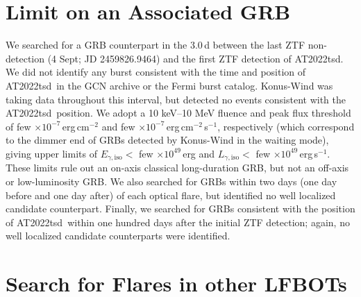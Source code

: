 \documentclass{nature_plusfigure}
\newcommand{\at}{AT2022tsd}
\begin{document}
\begin{methods}
\section{Limit on an Associated GRB}
\label{sec:grbsearch}

We searched for a GRB counterpart in the 3.0\,d between the last ZTF non-detection (4 Sept; JD 2459826.9464) and the first ZTF detection of \at. We did not identify any burst consistent with the time and position of \at\ in the GCN archive or the Fermi burst catalog. Konus-Wind was taking data throughout this interval, but detected no events consistent with the \at\ position. 
We adopt a 10 keV--10 MeV fluence and peak flux threshold of few $\times10^{-7}$\,erg\,cm$^{-2}$ and few $\times10^{-7}$\,erg\,cm$^{-2}$\,s$^{-1}$,
respectively (which correspond to the dimmer end of GRBs detected by Konus-Wind in the waiting mode\cite{Tsvetkova2021}),
giving upper limits of $E_{\gamma,\mathrm{iso}} <$ few $\times 10^{49}$\,erg and $L_{\gamma,\mathrm{iso}} <$ few $\times10^{49}$\,erg\,s$^{-1}$. 
These limits rule out an on-axis classical long-duration GRB, but not an off-axis or low-luminosity GRB\cite{Cano2017}.
We also searched for GRBs within two days (one day before and one day after) of each optical flare, but identified no well localized candidate counterpart.
Finally, we searched for GRBs consistent with the position of \at\ within one hundred days after the initial ZTF detection; again, no well localized candidate counterparts were identified.

\section{Search for Flares in other LFBOTs}
\label{sec:flare-search}


\end{methods}
\end{document}

